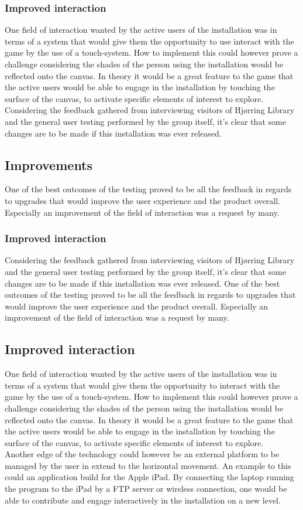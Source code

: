 \subsubsection{Improved interaction}
One field of interaction wanted by the active users of the installation was in terms of a system that would give them the opportunity to use interact with the game by the use of a touch-system. How to implement this could however prove a challenge considering the shades of the person using the installation would be reflected onto the canvas. In theory it would be a great feature to the game that the active users would be able to engage in the installation by touching the surface of the canvas, to activate specific elements of interest to explore.\\
Considering the feedback gathered from interviewing visitors of Hj{\o}rring Library and the general user testing performed by the group itself, it's clear that some changes are to be made if this installation was ever released.
\subsection{Improvements}
One of the best outcomes of the testing proved to be all the feedback in regards to upgrades that would improve the user experience and the product overall. Especially an improvement of the field of interaction was a request by many.  
\subsubsection{Improved interaction}
Considering the feedback gathered from interviewing visitors of Hj{\o}rring Library and the general user testing performed by the group itself, it's clear that some changes are to be made if this installation was ever released. One of the best outcomes of the testing proved to be all the feedback in regards to upgrades that would improve the user experience and the product overall. Especially an improvement of the field of interaction was a request by many.
\subsection{Improved interaction}
One field of interaction wanted by the active users of the installation was in terms of a system that would give them the opportunity to interact with the game by the use of a touch-system. How to implement this could however prove a challenge considering the shades of the person using the installation would be reflected onto the canvas. In theory it would be a great feature to the game that the active users would be able to engage in the installation by touching the surface of the canvas, to activate specific elements of interest to explore.\\
Another edge of the technology could however be an external platform to be managed by the user in extend to the horizontal movement. An example to this could an application build for the Apple iPad. By connecting the laptop running the program to the iPad by a FTP server or wireless connection, one would be able to contribute and engage interactively in the installation on a new level.
